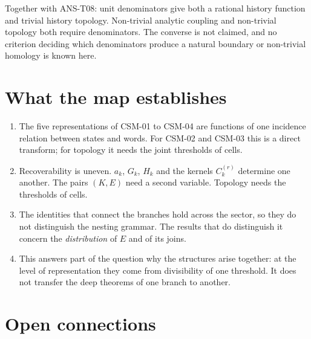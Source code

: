 \documentclass[
  11pt,
]{article}
\providecommand{\tightlist}{%
  \setlength{\itemsep}{0pt}\setlength{\parskip}{0pt}}
\begin{document}
Together with ANS-T08: unit denominators give both a rational history
function and trivial history topology. Non-trivial analytic coupling and
non-trivial topology both require denominators. The converse is not
claimed, and no criterion deciding which denominators produce a natural
boundary or non-trivial homology is known here.

\hypertarget{what-the-map-establishes}{%
\section{What the map establishes}\label{what-the-map-establishes}}

\begin{enumerate}
\def\labelenumi{\arabic{enumi}.}
\tightlist
\item
  The five representations of CSM-01 to CSM-04 are functions of one
  incidence relation between states and words. For CSM-02 and CSM-03
  this is a direct transform; for topology it needs the joint thresholds
  of cells.
\item
  Recoverability is uneven. \(a_k\), \(G_k\), \(H_k\) and the kernels
  \(C_k^{(r)}\) determine one another. The pairs \((K,E)\) need a second
  variable. Topology needs the thresholds of cells.
\item
  The identities that connect the branches hold across the sector, so
  they do not distinguish the nesting grammar. The results that do
  distinguish it concern the \emph{distribution} of \(E\) and of its
  joins.
\item
  This answers part of the question why the structures arise together:
  at the level of representation they come from divisibility of one
  threshold. It does not transfer the deep theorems of one branch to
  another.
\end{enumerate}

\hypertarget{open-connections}{%
\section{Open connections}\label{open-connections}}
\end{document}
